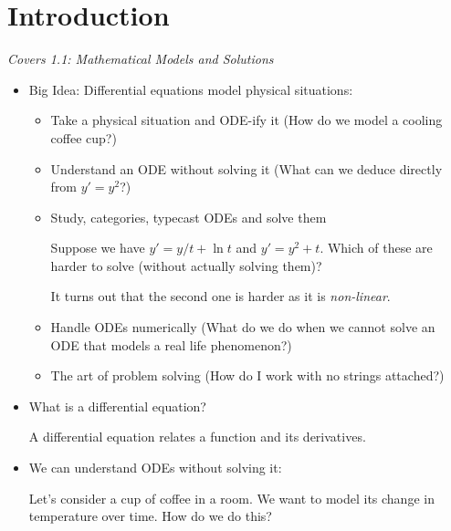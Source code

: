 \section{Introduction}
\textit{Covers 1.1: Mathematical Models and Solutions}
\begin{itemize}
    \item Big Idea: Differential equations model physical situations:
          \begin{itemize}
              \item Take a physical situation and ODE-ify it (How do we model a cooling coffee cup?)
              \item Understand an ODE without solving it (What can we deduce directly from $y'=y^2$?)
              \item Study, categories, typecast ODEs and solve them
                    \begin{example}
                        Suppose we have $y'=y/t+\ln t$ and $y'=y^2+t$. Which of these are harder to solve (without actually solving them)?
                        \vspace{2mm}

                        It turns out that the second one is harder as it is \textit{non-linear}.
                    \end{example}
              \item Handle ODEs numerically (What do we do when we cannot solve an ODE that models a real life phenomenon?)
              \item The art of problem solving (How do I work with no strings attached?)
          \end{itemize}
          \item What is a differential equation?
          \begin{definition}
              A differential equation relates a function and its derivatives.
          \end{definition}
          \item We can understand ODEs without solving it:
          \begin{example}
              Let's consider a cup of coffee in a room. We want to model its change in temperature over time. How do we do this?
              \vspace{2mm}


\end{example}
\end{itemize}

